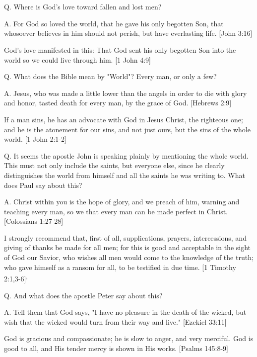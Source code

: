 \documentclass[../main.tex]{subfiles}
\begin{document}
	

	\section*{}
	Q. Where is God's love toward fallen and lost men?

	A. For God so loved the world, that he gave his only begotten Son, that whosoever believes in him should not perish, but have everlasting life. [John 3:16]

	God's love manifested in this: That God sent his only begotten Son into the world so we could live through him. [1 John 4:9]

	Q. What does the Bible mean by "World"? Every man, or only a few?

	A. Jesus, who was made a little lower than the angels in order to die with glory and honor, tasted death for every man, by the grace of God. [Hebrews 2:9]

	If a man sins, he has an advocate with God in Jesus Christ, the righteous one; and he is the atonement for our sins, and not just ours, but the sins of the whole world. [1 John 2:1-2]

	Q. It seems the apostle John is speaking plainly by mentioning the whole world. This must not only include the saints, but everyone else, since he clearly distinguishes the world from himself and all the saints he was writing to. What does Paul say about this?

	A. Christ within you is the hope of glory, and we preach of him, warning and teaching every man, so we that every man can be made perfect in Christ. [Colossians 1:27-28]

	I strongly recommend that, first of all, supplications, prayers, intercessions, and giving of thanks be made for all men; for this is good and acceptable in the sight of God our Savior, who wishes all men would come to the knowledge of the truth; who gave himself as a ransom for all, to be testified in due time. [1 Timothy 2:1,3-6]\textsuperscript{,}

	Q. And what does the apostle Peter say about this?

	A. Tell them that God says, "I have no pleasure in the death of the wicked, but wish that the wicked would turn from their way and live." [Ezekiel 33:11]

	God is gracious and compassionate; he is slow to anger, and very merciful. God is good to all, and His tender mercy is shown in His works. [Psalms 145:8-9]
\end{document}
